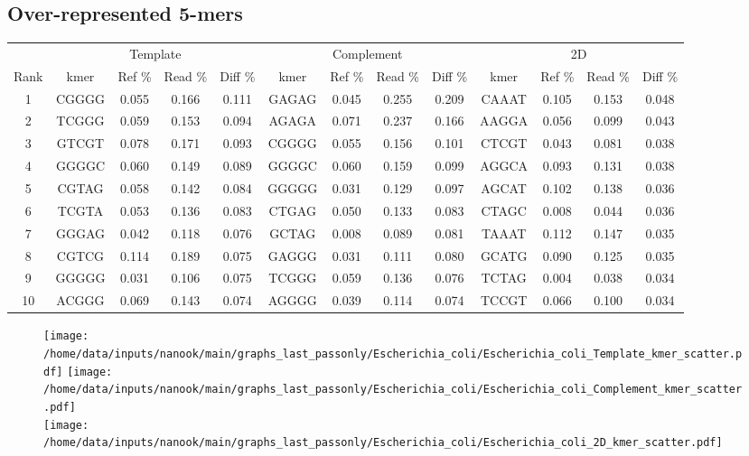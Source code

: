 \documentclass[a4paper,11pt,oneside]{article}
\begin{document}
\subsection*{Over-represented 5-mers}
\vspace{-3mm}
\begin{table}[H]
{\footnotesize
\fontsize{7pt}{9pt}\selectfont
\begin{tabular}{|c|c c c c|c c c c|c c c c|}
\cline{1-13}
 & \multicolumn{4}{c|}{Template} & \multicolumn{4}{c|}{Complement} & \multicolumn{4}{c|}{2D} \\
Rank & kmer & Ref \% & Read \% & Diff \% & kmer & Ref \% & Read \% & Diff \% & kmer & Ref \% & Read \% & Diff \% \\
\cline{1-13}
1 & CGGGG & 0.055 & 0.166 & 0.111 & GAGAG & 0.045 & 0.255 & 0.209 & CAAAT & 0.105 & 0.153 & 0.048 \\
2 & TCGGG & 0.059 & 0.153 & 0.094 & AGAGA & 0.071 & 0.237 & 0.166 & AAGGA & 0.056 & 0.099 & 0.043 \\
3 & GTCGT & 0.078 & 0.171 & 0.093 & CGGGG & 0.055 & 0.156 & 0.101 & CTCGT & 0.043 & 0.081 & 0.038 \\
4 & GGGGC & 0.060 & 0.149 & 0.089 & GGGGC & 0.060 & 0.159 & 0.099 & AGGCA & 0.093 & 0.131 & 0.038 \\
5 & CGTAG & 0.058 & 0.142 & 0.084 & GGGGG & 0.031 & 0.129 & 0.097 & AGCAT & 0.102 & 0.138 & 0.036 \\
6 & TCGTA & 0.053 & 0.136 & 0.083 & CTGAG & 0.050 & 0.133 & 0.083 & CTAGC & 0.008 & 0.044 & 0.036 \\
7 & GGGAG & 0.042 & 0.118 & 0.076 & GCTAG & 0.008 & 0.089 & 0.081 & TAAAT & 0.112 & 0.147 & 0.035 \\
8 & CGTCG & 0.114 & 0.189 & 0.075 & GAGGG & 0.031 & 0.111 & 0.080 & GCATG & 0.090 & 0.125 & 0.035 \\
9 & GGGGG & 0.031 & 0.106 & 0.075 & TCGGG & 0.059 & 0.136 & 0.076 & TCTAG & 0.004 & 0.038 & 0.034 \\
10 & ACGGG & 0.069 & 0.143 & 0.074 & AGGGG & 0.039 & 0.114 & 0.074 & TCCGT & 0.066 & 0.100 & 0.034 \\
\cline{1-13}
\end{tabular}
}
\end{table}
\vspace{-8mm}
\begin{figure}[H]
\centering
\texttt{[image: /home/data/inputs/nanook/main/graphs\_last\_passonly/Escherichia\_coli/Escherichia\_coli\_Template\_kmer\_scatter.pdf]} 
\texttt{[image: /home/data/inputs/nanook/main/graphs\_last\_passonly/Escherichia\_coli/Escherichia\_coli\_Complement\_kmer\_scatter.pdf]} \\
\texttt{[image: /home/data/inputs/nanook/main/graphs\_last\_passonly/Escherichia\_coli/Escherichia\_coli\_2D\_kmer\_scatter.pdf]} \\
\end{figure}
\end{document}
